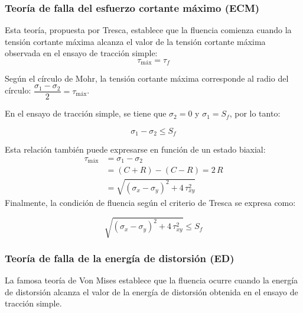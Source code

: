 \documentclass[spanish,11pt,a4paper]{article}
\begin{document}
	\subsubsection{Teoría de falla del esfuerzo cortante máximo (ECM)}
	Esta teoría, propuesta por Tresca, establece que la fluencia comienza cuando la tensión cortante máxima alcanza el valor de la tensión cortante máxima observada en el ensayo de tracción simple:
	\[\tau_\text{máx} = \tau_f\]
	
	Según el círculo de Mohr, la tensión cortante máxima corresponde al radio del círculo:
	 $\dfrac{\sigma_1-\sigma_2}{2} = \tau_\text{máx}$. 
	 
	 En el ensayo de tracción simple, se tiene que $\sigma_2 = 0$ y $\sigma_1 = S_f$, por lo tanto:
	\begin{tcolorbox}
		\begin{equation*}
			\sigma_1 - \sigma_2 \leq S_f
		\end{equation*}
	\end{tcolorbox}
	Esta relación también puede expresarse en función de un estado biaxial:
	\begin{equation*}
		\begin{aligned}
			\tau_\text{máx} &=  \sigma_1 - \sigma_2 \\
			&= (C+R)-(C-R) = 2\,R \\
			&= \sqrt{(\sigma_x - \sigma_y)^2 + 4\, \tau_{xy}^2}
		\end{aligned}
	\end{equation*}
	Finalmente, la condición de fluencia según el criterio de Tresca se expresa como:
	\begin{impo}
		\begin{equation*}
			\sqrt{(\sigma_x - \sigma_y)^2 + 4\, \tau_{xy}^2} \leq S_f
		\end{equation*}
	\end{impo}
	
	\subsubsection{Teoría de falla de la energía de distorsión (ED)}
	La famosa teoría de Von Mises establece que la fluencia ocurre cuando la energía de distorsión alcanza el valor de la energía de distorsión obtenida en el ensayo de tracción simple.
	
\end{document}
